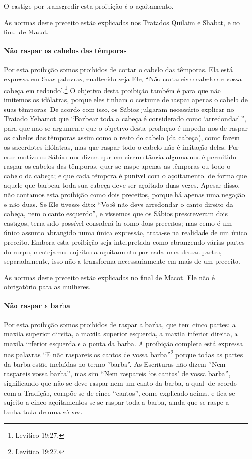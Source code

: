O castigo por transgredir esta proibição é o açoitamento.

As normas deste preceito estão explicadas nos Tratados Quilaim e Shabat,
e no final de Macot.

\paragraph{Não raspar os cabelos das têmporas}

Por esta proibição somos proibidos de cortar o cabelo das têmporas. Ela
está expressa em Suas palavras, enaltecido seja Ele, ``Não cortareis o
cabelo de vossa cabeça em redondo''.\footnote{Levítico 19:27.} O objetivo desta
proibição também é para que não imitemos os idólatras, porque eles
tinham o costume de raspar apenas o cabelo de suas têmporas. De acordo
com isso, os Sábios julgaram necessário explicar no Tratado Yebamot que
``Barbear toda a cabeça é considerado como `arredondar'\,'', para que não
se argumente que o objetivo desta proibição é impedir-nos de raspar os
cabelos das têmporas assim como o resto do cabelo (da cabeça), como
fazem os sacerdotes idólatras, mas que raspar todo o cabelo não é
imitação deles. Por esse motivo os Sábios nos dizem que em circunstância
alguma nos é permitido raspar os cabelos das têmporas, quer se raspe
apenas as têmporas ou todo o cabelo da cabeça; e que cada têmpora é
punível com o açoitamento, de forma que aquele que barbear toda sua
cabeça deve ser açoitado duas vezes. Apesar disso, não contamos esta
proibição como dois preceitos, porque há apenas uma negação e não duas.
Se Ele tivesse dito: ``Você não deve arredondar o canto direito da
cabeça, nem o canto esquerdo'', e víssemos que os Sábios prescreveram
dois castigos, teria sido possível considerá-la como dois preceitos; mas
como é um único assunto abrangido numa única expressão, trata-se na
realidade de um único preceito. Embora esta proibição seja interpretada
como abrangendo várias partes do corpo, e estejamos sujeitos a
açoitamento por cada uma dessas partes, separadamente, isso não a
transforma necessariamente em mais de um preceito.

As normas deste preceito estão explicadas no final de Macot. Ele não é
obrigatório para as mulheres.

\paragraph{Não raspar a barba}

Por esta proibição somos proibidos de raspar a barba, que tem cinco
partes: a maxila superior direita, a maxila superior esquerda, a maxila
inferior direita, a maxila inferior esquerda e a ponta da barba. A
proibição completa está expressa nas palavras ``E não raspareis os
cantos de vossa barba''\footnote{Levítico 19:27.} porque todas as partes da
barba estão incluídas no termo ``barba''. As Escrituras não dizem ``Nem
raspareis vossa barba'', mas sim ``Nem raspareis `os cantos' de vossa
barba'', significando que não se deve raspar nem um canto da barba, a
qual, de acordo com a Tradição, compõe-se de cinco ``cantos'', como
explicado acima, e fica-se sujeito a cinco açoitamentos se se raspar
toda a barba, ainda que se raspe a barba toda de uma só vez.

